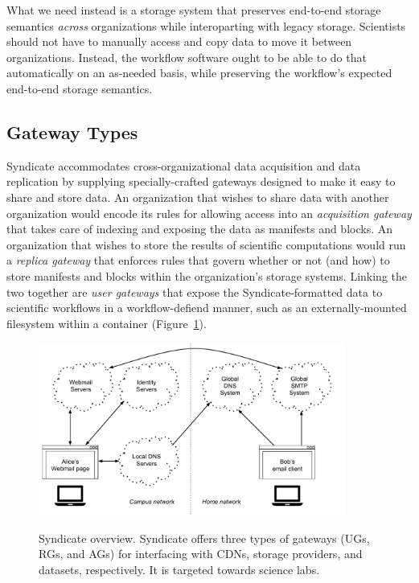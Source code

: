 What we need instead is a storage system that preserves end-to-end storage
semantics \emph{across} organizations while interoparting with legacy storage.
Scientists should not have to manually access and copy data to move it between
organizations.  Instead, the workflow
software ought to be able to do that automatically on an as-needed basis,
while preserving the workflow's expected end-to-end storage semantics.

\subsection{Gateway Types}

Syndicate accommodates cross-organizational data acquisition and
data replication by supplying specially-crafted gateways designed to make it
easy to share and store data.  An organization that wishes to share data with
another organization would encode its rules for allowing access into an
\emph{acquisition gateway} that takes care of indexing and exposing the data as
manifests and blocks.  An organization that wishes to store the results of
scientific computations would run a \emph{replica gateway} that enforces rules
that govern whether or not (and how) to store manifests and blocks within the
organization's storage systems.  Linking the two together are \emph{user
gateways} that expose the Syndicate-formatted data to scientific workflows in a
workflow-defiend manner, such as an externally-mounted filesystem within a
container (Figure~\ref{fig:chap3-syndicate-overview}).

\begin{figure}[h]
   \caption{Syndicate overview.  Syndicate offers three types of gateways (UGs,
   RGs, and AGs) for interfacing with CDNs, storage providers, and datasets,
   respectively.  It is targeted towards science labs.}
   \centering
   \includegraphics[width=0.9\textwidth,page=20]{figures/dissertation-figures}
   \label{fig:chap3-syndicate-overview}
\end{figure}

